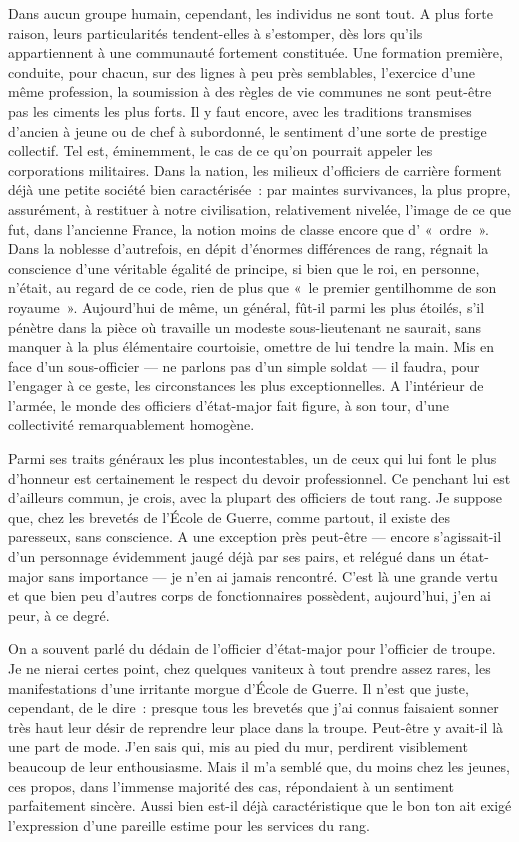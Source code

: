 \documentclass[french,twoside]{book} %
\begin{document}
Dans aucun groupe humain, cependant, les individus ne sont tout. A plus forte raison, leurs particularités tendent-elles à s’estomper, dès lors qu’ils appartiennent à une communauté fortement constituée. Une formation première, conduite, pour chacun, sur des lignes à peu près semblables, l’exercice d’une même profession, la soumission à des règles de vie communes ne sont peut-être pas les ciments les plus forts. Il y faut encore, avec les traditions transmises d’ancien à jeune ou de chef à subordonné, le sentiment d’une sorte de prestige collectif. Tel est, éminemment, le cas de ce qu’on pourrait appeler les corporations militaires. Dans la nation, les milieux d’officiers de carrière forment déjà une petite société bien caractérisée : par maintes survivances, la plus propre, assurément, à restituer à notre civilisation, relativement nivelée, l’image de ce que fut, dans l’ancienne France, la notion moins de classe encore que d’ « ordre ». Dans la noblesse d’autrefois, en dépit d’énormes différences de rang, régnait la conscience d’une véritable égalité de principe, si bien que le roi, en personne, n’était, au regard de ce code, rien de plus que « le premier gentilhomme de son royaume ». Aujourd’hui de même, un général, fût-il parmi les plus étoilés, s’il pénètre dans la pièce où travaille un modeste sous-lieutenant ne saurait, sans manquer à la plus élémentaire courtoisie, omettre de lui tendre la main. Mis en face d’un sous-officier — ne parlons pas d’un simple soldat — il faudra, pour l’engager à ce geste, les circonstances les plus exceptionnelles. A l’intérieur de l’armée, le monde des officiers d’état-major fait figure, à son tour, d’une collectivité remarquablement homogène.\par
Parmi ses traits généraux les plus incontestables, un de ceux qui lui font le plus d’honneur est certainement le respect du devoir professionnel. Ce penchant lui est d’ailleurs commun, je crois, avec la   plupart des officiers de tout rang. Je suppose que, chez les brevetés de l’École de Guerre, comme partout, il existe des paresseux, sans conscience. A une exception près peut-être — encore s’agissait-il d’un personnage évidemment jaugé déjà par ses pairs, et relégué dans un état-major sans importance — je n’en ai jamais rencontré. C’est là une grande vertu et que bien peu d’autres corps de fonctionnaires possèdent, aujourd’hui, j’en ai peur, à ce degré.\par
On a souvent parlé du dédain de l’officier d’état-major pour l’officier de troupe. Je ne nierai certes point, chez quelques vaniteux à tout prendre assez rares, les manifestations d’une irritante morgue d’École de Guerre. Il n’est que juste, cependant, de le dire : presque tous les brevetés que j’ai connus faisaient sonner très haut leur désir de reprendre leur place dans la troupe. Peut-être y avait-il là une part de mode. J’en sais qui, mis au pied du mur, perdirent visiblement beaucoup de leur enthousiasme. Mais il m’a semblé que, du moins chez les jeunes, ces propos, dans l’immense majorité des cas, répondaient à un sentiment parfaitement sincère. Aussi bien est-il déjà caractéristique que le bon ton ait exigé l’expression d’une pareille estime pour les services du rang.\par
\end{document}
